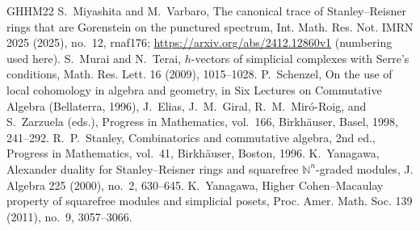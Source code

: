 \documentclass[a4paper,11pt]{amsart}
\theoremstyle{plain}
\theoremstyle{definition}
\theoremstyle{remark}
\newcommand{\NN}{\mathbb N}
\begin{document}
\begin{thebibliography}{GHHM22}
 S.~Miyashita and M.~Varbaro, The canonical trace of Stanley--Reisner rings that are Gorenstein on the punctured spectrum, Int. Math. Res. Not. IMRN 2025 (2025), no.~12, rnaf176; \url{https://arxiv.org/abs/2412.12860v1} (numbering used here).
 S.~Murai and N.~Terai, $h$-vectors of simplicial complexes with Serre's conditions, Math. Res. Lett. 16 (2009), 1015--1028.
 P.~Schenzel, On the use of local cohomology in algebra and geometry, in Six Lectures on Commutative Algebra (Bellaterra, 1996), J.~Elias, J.~M.~Giral, R.~M.~Mir\'o-Roig, and S.~Zarzuela (eds.), Progress in Mathematics, vol.~166, Birkh\"auser, Basel, 1998, 241--292.
 R.~P.~Stanley, Combinatorics and commutative algebra, 2nd ed., Progress in Mathematics, vol.~41, Birkh\"auser, Boston, 1996.
 K.~Yanagawa, Alexander duality for Stanley--Reisner rings and squarefree $\NN^n$-graded modules, J. Algebra 225 (2000), no.~2, 630--645.
 K.~Yanagawa, Higher Cohen--Macaulay property of squarefree modules and simplicial posets, Proc. Amer. Math. Soc. 139 (2011), no.~9, 3057--3066.
\end{thebibliography}
\end{document}
